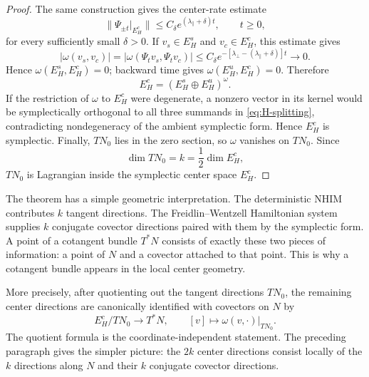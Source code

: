 \documentclass[11pt]{article}
\theoremstyle{definition}
\theoremstyle{remark}
\begin{document}
\begin{proof}
The same construction gives the center-rate estimate
\begin{equation}
\|\Psi_{\pm t}|_{E_H^c}\|\le C_\delta e^{(\lambda_{\parallel}+\delta)t},
\qquad t\ge0,
\label{eq:center-growth-delta}
\end{equation}
for every sufficiently small $\delta>0$.  If $v_s\in E_H^s$ and $v_c\in E_H^c$, this estimate gives
\begin{equation}
|\omega(v_s,v_c)|
=|\omega(\Psi_tv_s,\Psi_tv_c)|
\le C_\delta e^{-[\lambda_{\perp}-(\lambda_{\parallel}+\delta)]t}\longrightarrow0.
\end{equation}
Hence $\omega(E_H^s,E_H^c)=0$; backward time gives $\omega(E_H^u,E_H^c)=0$.  Therefore
\begin{equation}
E_H^c=(E_H^s\oplus E_H^u)^\omega.
\end{equation}
If the restriction of $\omega$ to $E_H^c$ were degenerate, a nonzero vector in its kernel would be symplectically orthogonal to all three summands in \eqref{eq:H-splitting}, contradicting nondegeneracy of the ambient symplectic form.  Hence $E_H^c$ is symplectic.  Finally, $TN_0$ lies in the zero section, so $\omega$ vanishes on $TN_0$.  Since
\begin{equation}
\dim TN_0=k=\frac12\dim E_H^c,
\end{equation}
$TN_0$ is Lagrangian inside the symplectic center space $E_H^c$.
\end{proof}

The theorem has a simple geometric interpretation.  The deterministic NHIM contributes $k$ tangent directions.  The Freidlin--Wentzell Hamiltonian system supplies $k$ conjugate covector directions paired with them by the symplectic form.  A point of a cotangent bundle $T^*N$ consists of exactly these two pieces of information: a point of $N$ and a covector attached to that point.  This is why a cotangent bundle appears in the local center geometry.

More precisely, after quotienting out the tangent directions $TN_0$, the remaining center directions are canonically identified with covectors on $N$ by
\begin{equation}
E_H^c/TN_0\longrightarrow T^*N,
\qquad
[v]\longmapsto \omega(v,\cdot)|_{TN_0}.
\label{eq:center-quotient}
\end{equation}
The quotient formula is the coordinate-independent statement.  The preceding paragraph gives the simpler picture: the $2k$ center directions consist locally of the $k$ directions along $N$ and their $k$ conjugate covector directions.
\end{document}

